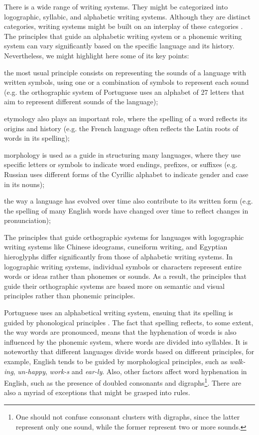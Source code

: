 \documentclass{article}
\begin{document}
There is a wide range of writing systems. They might be categorized into
logographic, syllabic, and alphabetic writing systems.  Although they are
distinct categories, writing systems might be built on an interplay of these
categories \cite{coulmas2003}. The principles that guide an alphabetic writing
system or a phonemic writing system can vary significantly based on the
specific language and its history. Nevertheless, we might highlight here some
of its key points:
\begin{enumerate*}[label=\arabic*)]
    \item the most usual principle consists on representing the sounds of a
	language with written symbols, using one or a combination of symbols to
	represent each sound (e.g. the orthographic system of Portuguese uses
	an alphabet of 27 letters that aim to represent different sounds of the
	language); 
    \item etymology also plays an important role, where the
	spelling of a word reflects its origins and history (e.g. the French
	language often reflects the Latin roots of words in its spelling);
    \item morphology is used as a guide in structuring many languages, where
	they use specific letters or symbols to indicate word endings,
	prefixes, or suffixes (e.g. Russian uses different forms of the
	Cyrillic alphabet to indicate gender and case in its nouns); 
    \item the way a language has evolved over time also contribute to its 
	written form (e.g. the spelling of many English words have changed 
	over time to reflect changes in pronunciation);
\end{enumerate*}
The principles that guide orthographic systems for languages with logographic
writing systems like Chinese ideograms, cuneiform writing, and Egyptian
hieroglyphs differ significantly from those of alphabetic writing systems. In
logographic writing systems, individual symbols or characters represent entire
words or ideas rather than phonemes or sounds. As a result, the principles that
guide their orthographic systems are based more on semantic and visual
principles rather than phonemic principles.

Portuguese uses an alphabetical writing system, ensuing that its spelling is
guided by phonological principles \cite{cagliari2015}. The fact that spelling
reflects, to some extent, the way words are pronounced, means that the
hyphenation of words is also influenced by the phonemic system, where words are
divided into syllables. It is noteworthy that different languages divide words
based on different principles, for example, English tends to be guided by
morphological principles, such as \emph{walk-ing}, \emph{un-happy},
\emph{work-s} and \emph{ear-ly}. Also, other factors affect word hyphenation in
English, such as the presence of doubled consonants and digraphs\footnote{One
should not confuse consonant clusters with digraphs, since the latter represent
only one sound, while the former represent two or more sounds.}. There are also
a myriad of exceptions that might be grasped into rules.
\end{document}
